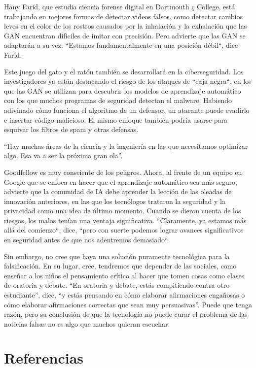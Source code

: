 \documentclass[a4paper]{article}
\begin{document}
 Hany Farid, que estudia ciencia forense digital en Dartmouth ç 
 College, está trabajando en mejores formas de detectar videos  
 falsos, como detectar cambios leves en el color de los rostros  
 causados por la inhalación y la exhalación que las GAN encuentran 
 difíciles de imitar con precisión. Pero advierte que las GAN se  
 adaptarán a su vez. ``Estamos fundamentalmente en una posición  
 débil``, dice Farid.



Este juego del gato y el ratón también se desarrollará en la 
ciberseguridad. Los investigadores ya están destacando el riesgo 
de los ataques de ``caja negra``, en los que las GAN se utilizan 
para descubrir los modelos de aprendizaje automático con los que 
muchos programas de seguridad detectan el malware. Habiendo 
adivinado cómo funciona el algoritmo de un defensor, un atacante 
puede evadirlo e insertar código malicioso. El mismo enfoque 
también podría usarse para esquivar los filtros de spam y otras 
defensas.

“Hay muchas áreas de la ciencia y la ingeniería en las que 
necesitamos optimizar algo. Esa va a ser la próxima gran ola”.

Goodfellow es muy consciente de los peligros. Ahora, al frente de 
un equipo en Google que se enfoca en hacer que el aprendizaje 
automático sea más seguro, advierte que la comunidad de IA debe 
aprender la lección de las oleadas de innovación anteriores, en 
las que los tecnólogos trataron la seguridad y la privacidad como 
una idea de último momento. Cuando se dieron cuenta de los 
riesgos, los malos tenían una ventaja significativa. ``Claramente, 
ya estamos más allá del comienzo``, dice, ``pero con suerte 
podemos lograr avances significativos en seguridad antes de que 
nos adentremos demasiado``.

Sin embargo, no cree que haya una solución puramente tecnológica 
para la falsificación. En su lugar, cree, tendremos que depender 
de las sociales, como enseñar a los niños el pensamiento crítico 
al hacer que tomen cosas como clases de oratoria y debate. “En 
oratoria y debate, estás compitiendo contra otro estudiante”, 
dice, “y estás pensando en cómo elaborar afirmaciones engañosas o 
cómo elaborar afirmaciones correctas que sean muy persuasivas”. 
Puede que tenga razón, pero su conclusión de que la tecnología no 
puede curar el problema de las noticias falsas no es algo que 
muchos quieran escuchar.


\section{Referencias}
\end{document}
